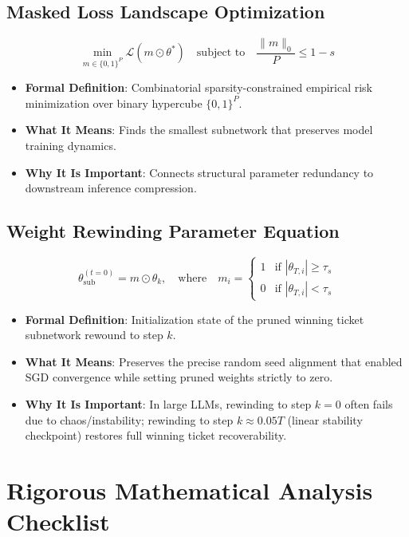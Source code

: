 \documentclass[11pt,a4paper]{article}
\theoremstyle{definition}
\begin{document}
\subsection{Masked Loss Landscape Optimization}
{\boldmath
\begin{equation}
\min_{m \in \{0, 1\}^P} \mathcal{L}\left( m \odot \theta^* \right) \quad \text{subject to} \quad \frac{\|m\|_0}{P} \le 1 - s
\end{equation}
}
\begin{itemize}
    \item \textbf{Formal Definition}: Combinatorial sparsity-constrained empirical risk minimization over binary hypercube $\{0, 1\}^P$.
    \item \textbf{What It Means}: Finds the smallest subnetwork that preserves model training dynamics.
    \item \textbf{Why It Is Important}: Connects structural parameter redundancy to downstream inference compression.
\end{itemize}

\subsection{Weight Rewinding Parameter Equation}
{\boldmath
\begin{equation}
\theta_{\text{sub}}^{(t=0)} = m \odot \theta_k, \quad \text{where} \quad m_i = \begin{cases} 1 & \text{if } |\theta_{T, i}| \ge \tau_s \\ 0 & \text{if } |\theta_{T, i}| < \tau_s \end{cases}
\end{equation}
}
\begin{itemize}
    \item \textbf{Formal Definition}: Initialization state of the pruned winning ticket subnetwork rewound to step $k$.
    \item \textbf{What It Means}: Preserves the precise random seed alignment that enabled SGD convergence while setting pruned weights strictly to zero.
    \item \textbf{Why It Is Important}: In large LLMs, rewinding to step $k=0$ often fails due to chaos/instability; rewinding to step $k \approx 0.05 T$ (linear stability checkpoint) restores full winning ticket recoverability.
\end{itemize}

\section{Rigorous Mathematical Analysis Checklist}
\end{document}

